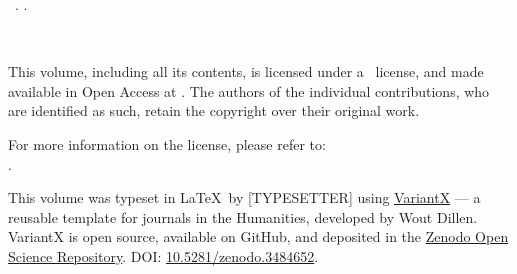\null\vfill\small
\noindent\thejournal \ \thevolume. \thejournalsubtitle. \\ \par
\noindent\doclicenseIcon \ \theyear \\ \par 
\noindent This volume, including all its contents, is licensed under a \doclicenseLongNameRef \ license, and made available in Open Access at \href{\thewebsite}{\thewebsite}. The authors of the individual contributions, who are identified as such, retain the copyright over their original work.  \\ \par
\noindent For more information on the \doclicenseNameRef license, please refer to: \\ \doclicenseURL.  \\ \par

\noindent This volume was typeset in \LaTeX~by [TYPESETTER] using \href{https://github.com/WoutDLN/variantx}{VariantX} --- a reusable template for journals in the Humanities, developed by Wout Dillen. VariantX is open source, available on GitHub, and deposited in the \href{https://about.zenodo.org}{Zenodo Open Science Repository}. DOI: \href{https://zenodo.org/record/3484652#.X0PdDy2w3kI}{10.5281/zenodo.3484652}.  
\newpage
